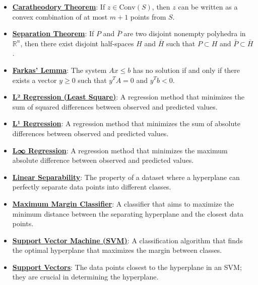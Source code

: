 \documentclass{article}%
\begin{document}
\begin{itemize}[leftmargin=*]
\item \href{https://www.math.purdue.edu/~yipn/421/2024-10-22-Convexity.pdf#page=8}{\textbf{Caratheodory Theorem}}: If $z \in \text{Conv}(S)$, then $z$ can be written as a convex combination of at most $m+1$ points from $S$.%
\item \href{https://www.math.purdue.edu/~yipn/421/2024-10-22-Convexity.pdf#page=10}{\textbf{Separation Theorem}}: If $P$ and $\bar{P}$ are two disjoint nonempty polyhedra in $\mathbb{R}^n$, then there exist disjoint half-spaces $H$ and $\bar{H}$ such that $P \subset H$ and $\bar{P} \subset \bar{H}$.%
\item \href{https://www.math.purdue.edu/~yipn/421/2024-10-22-Convexity.pdf#page=12}{\textbf{Farkas' Lemma}}: The system $Ax \le b$ has no solution if and only if there exists a vector $y \ge 0$ such that $y^T A = 0$ and $y^T b < 0$.%
\item \href{https://www.math.purdue.edu/~yipn/421/2024-10-22-Regression.pdf#page=4}{\textbf{L² Regression (Least Square)}}: A regression method that minimizes the sum of squared differences between observed and predicted values.%
\item \href{https://www.math.purdue.edu/~yipn/421/2024-10-22-Regression.pdf#page=5}{\textbf{L¹ Regression}}: A regression method that minimizes the sum of absolute differences between observed and predicted values.%
\item \href{https://www.math.purdue.edu/~yipn/421/2024-10-22-Regression.pdf#page=6}{\textbf{L∞ Regression}}: A regression method that minimizes the maximum absolute difference between observed and predicted values.%
\item \href{https://www.math.purdue.edu/~yipn/421/2024-10-22-Regression.pdf#page=8}{\textbf{Linear Separability}}: The property of a dataset where a hyperplane can perfectly separate data points into different classes.%
\item \href{https://www.math.purdue.edu/~yipn/421/2024-10-22-Regression.pdf#page=9}{\textbf{Maximum Margin Classifier}}: A classifier that aims to maximize the minimum distance between the separating hyperplane and the closest data points.%
\item \href{https://www.math.purdue.edu/~yipn/421/2024-10-22-Regression.pdf#page=10}{\textbf{Support Vector Machine (SVM)}}: A classification algorithm that finds the optimal hyperplane that maximizes the margin between classes.%
\item \href{https://www.math.purdue.edu/~yipn/421/2024-10-22-Regression.pdf#page=10}{\textbf{Support Vectors}}: The data points closest to the hyperplane in an SVM; they are crucial in determining the hyperplane.%

\end{itemize}
\end{document}
